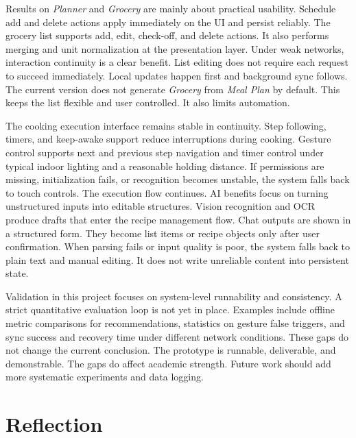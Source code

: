 \documentclass[journal]{IEEEtran}
\begin{document}
Results on \textit{Planner} and \textit{Grocery} are mainly about practical usability. Schedule add and delete actions apply immediately on the UI and persist reliably. The grocery list supports add, edit, check-off, and delete actions. It also performs merging and unit normalization at the presentation layer. Under weak networks, interaction continuity is a clear benefit. List editing does not require each request to succeed immediately. Local updates happen first and background sync follows. The current version does not generate \textit{Grocery} from \textit{Meal Plan} by default. This keeps the list flexible and user controlled. It also limits automation.

The cooking execution interface remains stable in continuity. Step following, timers, and keep-awake support reduce interruptions during cooking. Gesture control supports next and previous step navigation and timer control under typical indoor lighting and a reasonable holding distance. If permissions are missing, initialization fails, or recognition becomes unstable, the system falls back to touch controls. The execution flow continues. AI benefits focus on turning unstructured inputs into editable structures. Vision recognition and OCR produce drafts that enter the recipe management flow. Chat outputs are shown in a structured form. They become list items or recipe objects only after user confirmation. When parsing fails or input quality is poor, the system falls back to plain text and manual editing. It does not write unreliable content into persistent state.

Validation in this project focuses on system-level runnability and consistency. A strict quantitative evaluation loop is not yet in place. Examples include offline metric comparisons for recommendations, statistics on gesture false triggers, and sync success and recovery time under different network conditions. These gaps do not change the current conclusion. The prototype is runnable, deliverable, and demonstrable. The gaps do affect academic strength. Future work should add more systematic experiments and data logging.

\section{Reflection}
\end{document}
